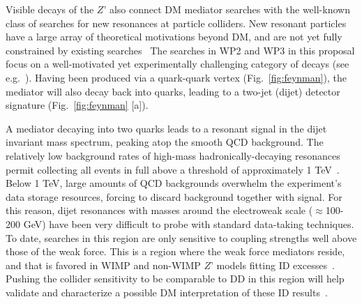 Visible decays of the  $Z’$ also connect DM mediator searches with the well-known class of searches for new resonances at particle colliders. 
New resonant particles have a large array of theoretical motivations beyond DM, and are not yet fully constrained by existing searches~\cite{ToBeCited}%
The searches in WP2 and WP3 in this proposal focus on a well-motivated yet experimentally challenging category of decays (see e.g.~\cite{Chala:2015ama}). 
Having been produced via a quark-quark vertex (Fig.~\ref{fig:feynman}), the mediator will also decay back into quarks, leading to a two-jet (dijet) detector signature (Fig.~\ref{fig:feynman} [a]).

A mediator decaying into two quarks leads to a resonant signal in the dijet invariant mass spectrum, peaking atop the smooth QCD background. 
The relatively low background rates of high-mass hadronically-decaying resonances permit collecting all events in full above a threshold of approximately 1 TeV~\cite{ToBeCited}. Below 1 TeV, large amounts of QCD backgrounds overwhelm the experiment’s data storage resources, forcing to discard background together with signal.  
For this reason, dijet resonances with masses around the electroweak scale ($\approx$100-200 GeV) have been very difficult to probe with standard data-taking techniques. 
To date, searches in this region are only sensitive to coupling strengths well above those of the weak force. 
This is a region where the weak force mediators reside, and that is favored in WIMP and non-WIMP $Z’$ models fitting ID excesses~\cite{ToBeCited}. %
Pushing the collider sensitivity to be comparable to DD in this region will help validate and characterize a possible DM interpretation of these ID results~\cite{Ellis:2018xal,Kang:2020huh}.

